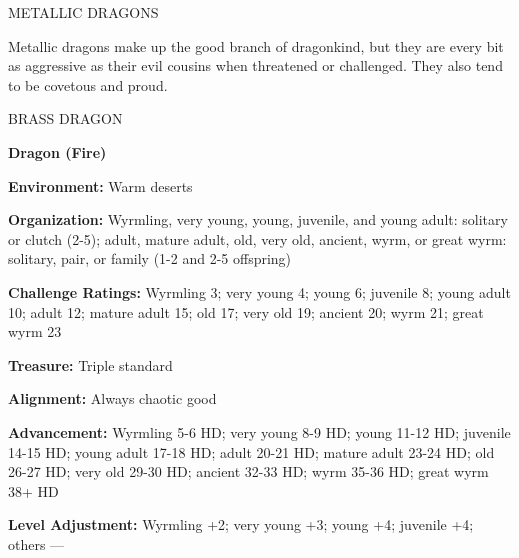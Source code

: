 \documentclass{article}
\begin{document}
\vspace{12pt}
{\LARGE{}METALLIC DRAGONS}

Metallic dragons make up the good branch of dragonkind, but they are every bit 
as aggressive as their evil cousins when threatened or challenged. They also tend 
to be covetous and proud.

\vspace{12pt}
BRASS DRAGON

\textbf{Dragon (Fire)}

\textbf{Environment:} Warm deserts

\textbf{Organization:} Wyrmling, very young, young, juvenile, and young adult: 
solitary or clutch (2-5); adult, mature adult, old, very old, ancient, wyrm, or 
great wyrm: solitary, pair, or family (1-2 and 2-5 offspring)

\textbf{Challenge Ratings:} Wyrmling 3; very young 4; young 6; juvenile 8; young 
adult 10; adult 12; mature adult 15; old 17; very old 19; ancient 20; wyrm 21; 
great wyrm 23

\textbf{Treasure:} Triple standard

\textbf{Alignment:} Always chaotic good

\textbf{Advancement:} Wyrmling 5-6 HD; very young 8-9 HD; young 11-12 HD; juvenile 
14-15 HD; young adult 17-18 HD; adult 20-21 HD; mature adult 23-24 HD; old 26-27 
HD; very old 29-30 HD; ancient 32-33 HD; wyrm 35-36 HD; great wyrm 38+ HD

\textbf{Level Adjustment:} Wyrmling +2; very young +3; young +4; juvenile +4; others 
---
\end{document}
